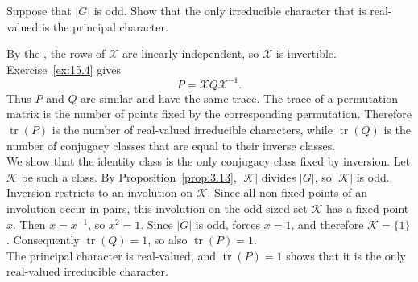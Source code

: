 \documentclass[../Odyssey_Project.tex]{subfiles}
\begin{document}
\begin{exercise}
\label{ex:15.5}
Suppose that $|G|$ is odd. Show that the only irreducible character that is real-valued is the principal character.
\end{exercise}
\begin{solution}
    By the , the rows of $\mathcal{X}$ are linearly independent, so $\mathcal{X}$ is invertible. Exercise~\ref{ex:15.4} gives
    \[
        P=\mathcal{X}Q\mathcal{X}^{-1}.
    \]
    Thus $P$ and $Q$ are similar and have the same trace. The trace of a permutation matrix is the number of points fixed by the corresponding permutation. Therefore $\operatorname{tr}(P)$ is the number of real-valued irreducible characters, while $\operatorname{tr}(Q)$ is the number of conjugacy classes that are equal to their inverse classes.\\
    We show that the identity class is the only conjugacy class fixed by inversion. Let $\mathcal{K}$ be such a class. By Proposition~\ref{prop:3.13}, $|\mathcal{K}|$ divides $|G|$, so $|\mathcal{K}|$ is odd. Inversion restricts to an involution on $\mathcal{K}$. Since all non-fixed points of an involution occur in pairs, this involution on the odd-sized set $\mathcal{K}$ has a fixed point $x$. Then $x=x^{-1}$, so $x^2=1$. Since $|G|$ is odd,  forces $x=1$, and therefore $\mathcal{K}=\{1\}$. Consequently $\operatorname{tr}(Q)=1$, so also $\operatorname{tr}(P)=1$.\\
    The principal character is real-valued, and $\operatorname{tr}(P)=1$ shows that it is the only real-valued irreducible character.
\end{solution}
\end{document}
